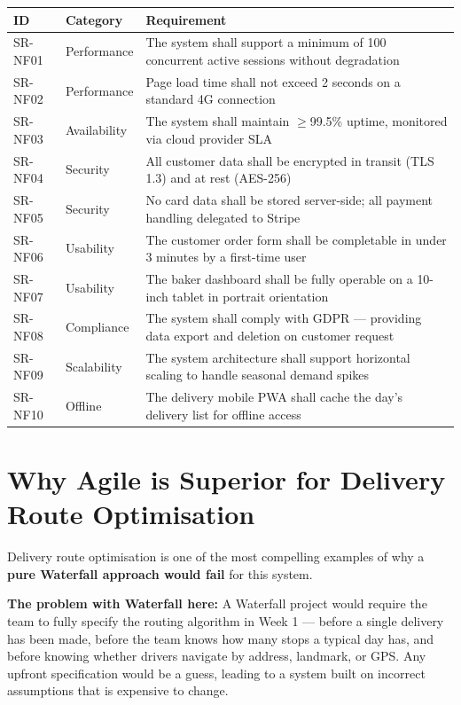\documentclass[12pt, a4paper]{report}
\begin{document}
\begin{longtable}{L{1.8cm} L{2.5cm} L{9.5cm}}
  \toprule
  \textbf{ID} & \textbf{Category} & \textbf{Requirement} \\
  \midrule
  \endhead
  \bottomrule
  \endfoot

  SR-NF01 & Performance   & The system shall support a minimum of 100 concurrent active sessions without degradation \\[4pt]
  SR-NF02 & Performance   & Page load time shall not exceed 2 seconds on a standard 4G connection \\[4pt]
  SR-NF03 & Availability  & The system shall maintain $\geq$99.5\% uptime, monitored via cloud provider SLA \\[4pt]
  SR-NF04 & Security      & All customer data shall be encrypted in transit (TLS 1.3) and at rest (AES-256) \\[4pt]
  SR-NF05 & Security      & No card data shall be stored server-side; all payment handling delegated to Stripe \\[4pt]
  SR-NF06 & Usability     & The customer order form shall be completable in under 3 minutes by a first-time user \\[4pt]
  SR-NF07 & Usability     & The baker dashboard shall be fully operable on a 10-inch tablet in portrait orientation \\[4pt]
  SR-NF08 & Compliance    & The system shall comply with GDPR --- providing data export and deletion on customer request \\[4pt]
  SR-NF09 & Scalability   & The system architecture shall support horizontal scaling to handle seasonal demand spikes \\[4pt]
  SR-NF10 & Offline       & The delivery mobile PWA shall cache the day's delivery list for offline access \\

\end{longtable}

\section{Why Agile is Superior for Delivery Route Optimisation}

Delivery route optimisation is one of the most compelling examples of why a
\textbf{pure Waterfall approach would fail} for this system.

\textbf{The problem with Waterfall here:} A Waterfall project would require
the team to fully specify the routing algorithm in Week 1 --- before a single
delivery has been made, before the team knows how many stops a typical day
has, and before knowing whether drivers navigate by address, landmark, or GPS.
Any upfront specification would be a guess, leading to a system built on
incorrect assumptions that is expensive to change.
\end{document}
